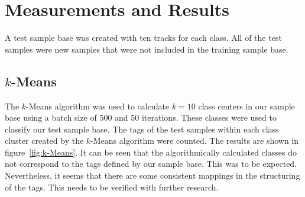 \section{Measurements and Results}
\label{sec:Measurements}
A test sample base was created with ten tracks for each class. All of the test samples were new samples that were not included in the training sample base.

\subsection{$k$-Means}
The $k$-Means algorithm was used to calculate $k=10$ class centers in our sample base using a batch size of 500 and 50 iterations. These classes were used to classify our test sample base. The tags of the test samples within each class cluster created by the $k$-Means algorithm were counted. The results are shown in figure~\ref{fig:k-Means}. It can be seen that the algorithmically calculated classes do not correspond to the tags defined by our sample base. This was to be expected. Nevertheless, it seems that there are some consistent mappings in the structuring of the tags. This needs to be verified with further research.

